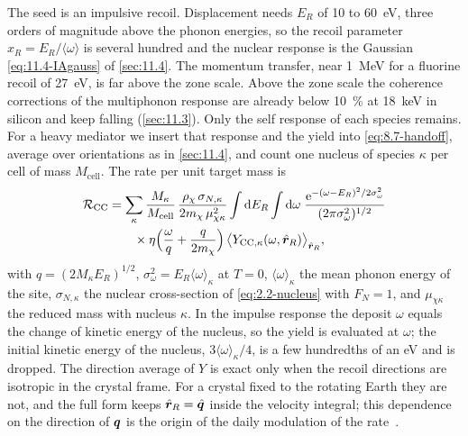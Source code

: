 The seed is an impulsive recoil. Displacement needs $E_R$ of 10 to \SI{60}{eV}, three orders of magnitude above the phonon energies, so the recoil parameter $x_R = E_R/\langle\omega\rangle$ is several hundred and the nuclear response is the Gaussian \cref{eq:11.4-IAgauss} of \cref{sec:11.4}. The momentum transfer, near \SI{1}{MeV} for a fluorine recoil of \SI{27}{eV}, is far above the zone scale. Above the zone scale the coherence corrections of the multiphonon response are already below \SI{10}{\percent} at \SI{18}{keV} in silicon and keep falling (\cref{sec:11.3}). Only the self response of each species remains. For a heavy mediator we insert that response and the yield into \cref{eq:8.7-handoff}, average over orientations as in \cref{sec:11.4}, and count one nucleus of species $\kappa$ per cell of mass $M_{\mathrm{cell}}$. The rate per unit target mass is
\begin{equation}
  \begin{split}
  \mathcal{R}_{\mathrm{CC}} &= \sum_\kappa\frac{M_\kappa}{M_{\mathrm{cell}}}\,\frac{\rho_\chi\,\sigma_{N,\kappa}}{2m_{\chi}\,\mu_{\chi\kappa}^2}\int\mathrm{d} E_R\int\mathrm{d}\omega\;\frac{\mathrm{e}^{-(\omega - E_R)^2/2\sigma_\omega^2}}{(2\pi\sigma_\omega^2)^{1/2}} \\
  &\qquad\times\eta\Bigl(\frac{\omega}{q} + \frac{q}{2m_{\chi}}\Bigr)\,\bigl\langle Y_{\mathrm{CC},\kappa}(\omega,\hat{\bm{r}}_R)\bigr\rangle_{\hat{\bm{r}}_R} ,
  \end{split}
  \label{eq:16.6-ccrate}
\end{equation}
with $q = (2M_\kappa E_R)^{1/2}$, $\sigma_\omega^2 = E_R\langle\omega\rangle_\kappa$ at $T = 0$, $\langle\omega\rangle_\kappa$ the mean phonon energy of the site, $\sigma_{N,\kappa}$ the nuclear cross-section of \cref{eq:2.2-nucleus} with $F_N = 1$, and $\mu_{\chi\kappa}$ the reduced mass with nucleus $\kappa$. In the impulse response the deposit $\omega$ equals the change of kinetic energy of the nucleus, so the yield is evaluated at $\omega$; the initial kinetic energy of the nucleus, $3\langle\omega\rangle_\kappa/4$, is a few hundredths of an eV and is dropped. The direction average of $Y$ is exact only when the recoil directions are isotropic in the crystal frame. For a crystal fixed to the rotating Earth they are not, and the full form keeps $\hat{\bm{r}}_R = \hat{\bm{q}}$ inside the velocity integral; this dependence on the direction of $\bm{q}$ is the origin of the daily modulation of the rate~\cite[Eq.~(10)]{budnik2018direct}.


